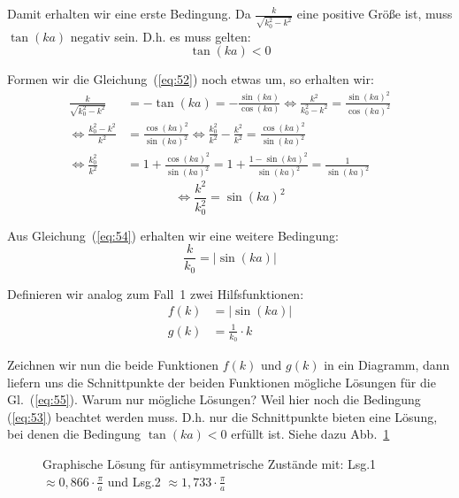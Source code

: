 Damit erhalten wir eine erste Bedingung. Da $\frac k {\sqrt{k_0^2-k^2}}$ eine
positive Größe ist, muss $\tan(ka)$ negativ sein. D.h. es muss gelten:
\begin{equation}
  \label{eq:53}
  \tan(ka) < 0
\end{equation}

Formen wir die Gleichung~(\ref{eq:52}) noch etwas um, so erhalten wir:
\begin{align*}
  \frac k {\sqrt{k_0^2-k^2}} &= -\tan(ka) = -\frac {\sin(ka)} {\cos(ka)}
   \Leftrightarrow \frac {k^2}{k_0^2-k^2} = \frac {\sin(ka)^2} {\cos(ka)^2}\\
   \Leftrightarrow \frac {k_0^2-k^2} {k^2} &= \frac {\cos(ka)^2}{\sin(ka)^2}
    \Leftrightarrow \frac {k_0^2}{k^2}-\frac{k^2}{k^2} = \frac {\cos(ka)^2}{\sin(ka)^2}\\
   \Leftrightarrow \frac {k_0^2} {k^2} &=1+\frac {\cos(ka)^2}{\sin(ka)^2}
    =1+\frac {1-\sin(ka)^2} {\sin(ka)^2}
    = \frac 1 {\sin(ka)^2}
\end{align*}
\begin{equation}
  \label{eq:54}
   \Leftrightarrow \frac {k^2} {k_0^2} = \sin(ka)^2
\end{equation}

Aus Gleichung~(\ref{eq:54}) erhalten wir eine weitere Bedingung:
\begin{equation}
  \label{eq:55}
  \frac {k} {k_0} = |\sin(ka)|
\end{equation}

Definieren wir analog zum Fall~1 zwei Hilfsfunktionen:
\begin{align*}
  f(k) &= |\sin(ka)|\\
  g(k) &= \frac 1 {k_0} \cdot k
\end{align*}

Zeichnen wir nun die beide Funktionen $f(k)$ und $g(k)$ in ein Diagramm, dann
liefern uns die Schnittpunkte der beiden Funktionen mögliche Lösungen für die
Gl.~(\ref{eq:55}). Warum nur mögliche Lösungen? Weil hier noch die Bedingung
(\ref{eq:53}) beachtet werden muss. D.h. nur die Schnittpunkte bieten eine
Lösung, bei denen die Bedingung $\tan(ka)<0$ erfüllt ist. Siehe dazu Abb.~\ref{fig:10}

\begin{figure}[!ht]
  \begin{center}
    
    \caption{Graphische Lösung für antisymmetrische Zustände mit:
      Lsg.1 $\approx 0,866\cdot \frac \pi a $ und  
      Lsg.2 $\approx 1,733\cdot \frac \pi a $}
    \label{fig:10}
  \end{center}
\end{figure}

